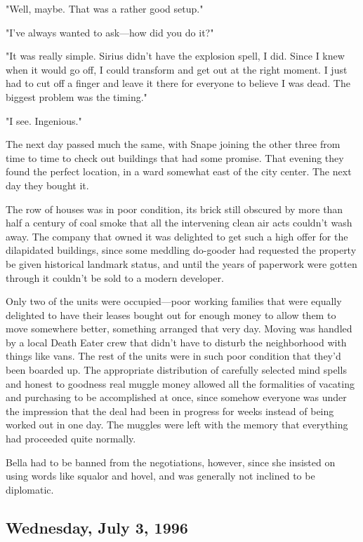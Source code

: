 "Well, maybe. That was a rather good setup."

"I've always wanted to ask—how did you do it?"

"It was really simple. Sirius didn't have the explosion spell, I did. Since I knew when it would go off, I could transform and get out at the right moment. I just had to cut off a finger and leave it there for everyone to believe I was dead. The biggest problem was the timing."

"I see. Ingenious."

The next day passed much the same, with Snape joining the other three from time to time to check out buildings that had some promise. That evening they found the perfect location, in a ward somewhat east of the city center. The next day they bought it.

The row of houses was in poor condition, its brick still obscured by more than half a century of coal smoke that all the intervening clean air acts couldn't wash away. The company that owned it was delighted to get such a high offer for the dilapidated buildings, since some meddling do-gooder had requested the property be given historical landmark status, and until the years of paperwork were gotten through it couldn't be sold to a modern developer.

Only two of the units were occupied—poor working families that were equally delighted to have their leases bought out for enough money to allow them to move somewhere better, something arranged that very day. Moving was handled by a local Death Eater crew that didn't have to disturb the neighborhood with things like vans. The rest of the units were in such poor condition that they'd been boarded up. The appropriate distribution of carefully selected mind spells and honest to goodness real muggle money allowed all the formalities of vacating and purchasing to be accomplished at once, since somehow everyone was under the impression that the deal had been in progress for weeks instead of being worked out in one day. The muggles were left with the memory that everything had proceeded quite normally.

Bella had to be banned from the negotiations, however, since she insisted on using words like squalor and hovel, and was generally not inclined to be diplomatic.

\subsection{Wednesday, July 3, 1996}

